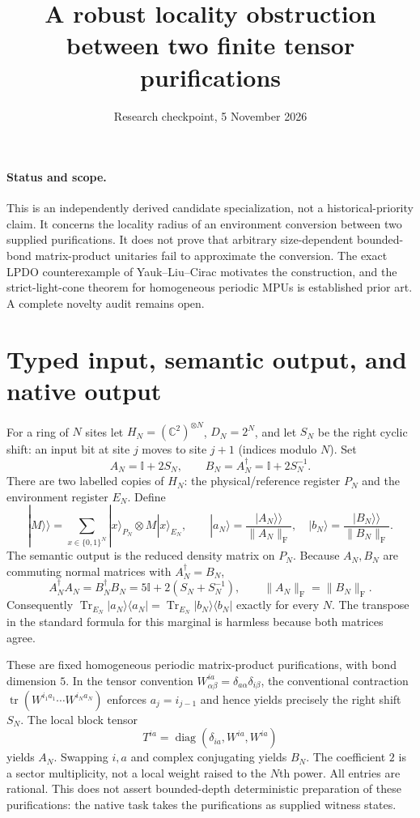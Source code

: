 \documentclass[11pt]{article}
\title{A robust locality obstruction between two finite tensor purifications}
\date{Research checkpoint, 5 November 2026}
\newcommand{\Id}{\mathbb I}
\newcommand{\F}{\mathrm F}
\newcommand{\Tr}{\operatorname{Tr}}
\begin{document}
\maketitle
\paragraph{Status and scope.}
This is an independently derived candidate specialization, not a historical-priority claim. It concerns the locality radius of an environment conversion between two supplied purifications. It does not prove that arbitrary size-dependent bounded-bond matrix-product unitaries fail to approximate the conversion. The exact LPDO counterexample of Yauk--Liu--Cirac motivates the construction, and the strict-light-cone theorem for homogeneous periodic MPUs is established prior art. A complete novelty audit remains open.

\section{Typed input, semantic output, and native output}
For a ring of $N$ sites let
$H_N=(\mathbb C^2)^{\otimes N}$, $D_N=2^N$, and let $S_N$ be the right cyclic shift: an input bit at site $j$ moves to site $j+1$ (indices modulo $N$). Set
\[
 A_N=\Id+2S_N,\qquad B_N=A_N^\dagger=\Id+2S_N^{-1}.
\]
There are two labelled copies of $H_N$: the physical/reference register $P_N$ and the environment register $E_N$. Define
\[
 |M\rangle\!\rangle=\sum_{x\in\{0,1\}^N}|x\rangle_{P_N}\otimes M|x\rangle_{E_N},\qquad
 |a_N\rangle=\frac{|A_N\rangle\!\rangle}{\|A_N\|_\F},\quad
 |b_N\rangle=\frac{|B_N\rangle\!\rangle}{\|B_N\|_\F}.
\]
The semantic output is the reduced density matrix on $P_N$.
Because $A_N,B_N$ are commuting normal matrices with $A_N^\dagger=B_N$,
\[
 A_N^\dagger A_N=B_N^\dagger B_N
 =5\Id+2(S_N+S_N^{-1}),\qquad \|A_N\|_\F=\|B_N\|_\F.
\]
Consequently $\Tr_{E_N}|a_N\rangle\langle a_N|=\Tr_{E_N}|b_N\rangle\langle b_N|$ exactly for every $N$.
The transpose in the standard formula for this marginal is harmless because both matrices agree.

These are fixed homogeneous periodic matrix-product purifications, with bond dimension $5$. In the tensor convention
$W^{ia}_{\alpha\beta}=\delta_{a\alpha}\delta_{i\beta}$,
the conventional contraction $\operatorname{tr}(W^{i_1a_1}\cdots W^{i_Na_N})$ enforces $a_j=i_{j-1}$ and hence yields precisely the right shift $S_N$. The local block tensor
\[
 T^{ia}=\operatorname{diag}(\delta_{ia},W^{ia},W^{ia})
\]
yields $A_N$. Swapping $i,a$ and complex conjugating yields $B_N$.
The coefficient $2$ is a sector multiplicity, not a local weight raised to the $N$th power. All entries are rational. This does not assert bounded-depth deterministic preparation of these purifications: the native task takes the purifications as supplied witness states.
\end{document}
